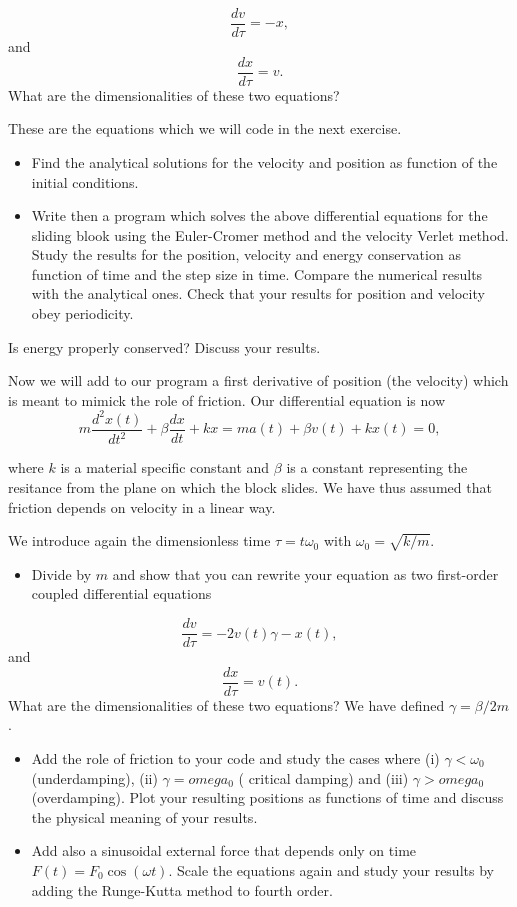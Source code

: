 \noindent
\[
\frac{dv}{d\tau} = -x,
\]
and
\[
\frac{dx}{d\tau} = v.
\]
What are the dimensionalities of these two equations?

These are the equations which we will code in the next exercise.

\begin{itemize}
\item Find the analytical solutions for the velocity and position as function of the initial conditions. 

\item Write then a program which solves the above differential equations for the sliding blook using the Euler-Cromer  method and the velocity Verlet method. Study the results for the position, velocity and energy conservation as function of time and the step size in time. Compare the numerical results with the analytical ones. Check that your results for position and velocity obey periodicity. 
\end{itemize}

\noindent
Is energy properly conserved? Discuss your results. 

Now we will add to our program a first derivative of position (the velocity) which is meant to mimick the role of friction.
Our differential equation is now
\[
m\frac{d^2x(t)}{dt^2}+\beta\frac{dx}{dt}+kx=ma(t)+\beta v(t)+kx(t)=0,
\]

where $k$ is a material specific constant and $\beta$ is a constant
representing the resitance from the plane on which the block slides.
We have thus assumed that friction depends on velocity in a linear
way.

We introduce again the dimensionless time $\tau = t\omega_0$ with
$\omega_0=\sqrt{k/m}$.

\begin{itemize}
\item Divide by $m$ and show that you can rewrite your equation as two first-order coupled differential equations
\end{itemize}

\noindent
\[
\frac{dv}{d\tau} = -2v(t)\gamma-x(t),
\]
and
\[
\frac{dx}{d\tau} = v(t).
\]
What are the dimensionalities of these two equations? We have defined $\gamma = \beta/2m$.  


\begin{itemize}
\item Add the role of friction to your code and study the cases where (i) $\gamma < \omega_0$ (underdamping), (ii) $\gamma = omega_0$ ( critical damping) and (iii) $\gamma > omega_0$ (overdamping). Plot your resulting positions as functions of time and discuss the physical meaning of your results.
\item Add also a sinusoidal external force that depends only on time $F(t)=F_0\cos{(\omega t)}$. Scale the equations again and study your results by adding the Runge-Kutta method to fourth order.
\end{itemize}

